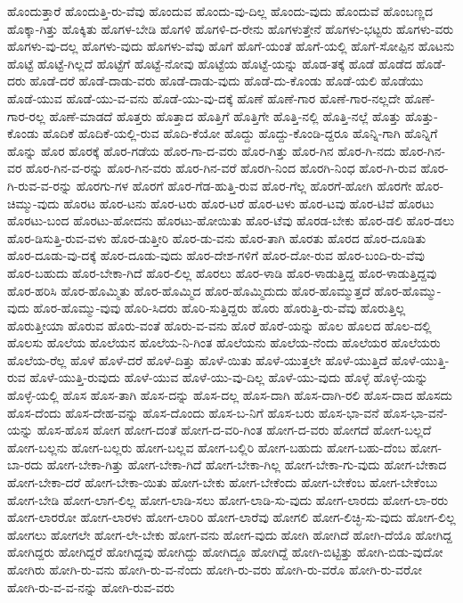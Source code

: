 {ಹೊಂದುತ್ತಾರೆ
ಹೊಂದುತ್ತಿ-ರು-ವೆವು
ಹೊಂದುವ
ಹೊಂದು-ವು-ದಿಲ್ಲ
ಹೊಂದು-ವುದು
ಹೊಂದುವೆ
ಹೊಂಬಣ್ಣದ
ಹೊಕ್ಕಾ-ಗಿತ್ತು
ಹೊಕ್ಕಿತು
ಹೊಗಳ-ಬೇಡಿ
ಹೊಗಳಿ
ಹೊಗಳಿ-ದ-ರೇನು
ಹೊಗಳುತ್ತೇನೆ
ಹೊಗಳು-ಭಟ್ಟರು
ಹೊಗಳು-ವರು
ಹೊಗಳು-ವು-ದಲ್ಲ
ಹೊಗಳು-ವುದು
ಹೊಗಳು-ವೆವು
ಹೊಗೆ
ಹೊಗೆ-ಯಂತೆ
ಹೊಗೆ-ಯಲ್ಲಿ
ಹೊಗೆ-ಸೋಪ್ಪಿನ
ಹೊಟನು
ಹೊಟ್ಟೆ
ಹೊಟ್ಟೆ-ಗಿಲ್ಲದೆ
ಹೊಟ್ಟೆಗೆ
ಹೊಟ್ಟೆ-ನೋವು
ಹೊಟ್ಟೆಯ
ಹೊಟ್ಟೆ-ಯನ್ನು
ಹೊಡ-ತಕ್ಕೆ
ಹೊಡೆ
ಹೊಡೆದ
ಹೊಡೆ-ದರು
ಹೊಡೆ-ದರೆ
ಹೊಡೆ-ದಾಡು-ವರು
ಹೊಡೆ-ದಾಡು-ವುದು
ಹೊಡೆ-ದು-ಕೊಂಡು
ಹೊಡೆ-ಯಲಿ
ಹೊಡೆಯು
ಹೊಡೆ-ಯುವ
ಹೊಡೆ-ಯು-ವ-ವನು
ಹೊಡೆ-ಯು-ವು-ದಕ್ಕೆ
ಹೊಣೆ
ಹೊಣೆ-ಗಾರ
ಹೊಣೆ-ಗಾರ-ನಲ್ಲದೇ
ಹೊಣೆ-ಗಾರ-ರಲ್ಲ
ಹೊಣೆ-ಮಾಡದೆ
ಹೊತ್ತರು
ಹೊತ್ತಾದ
ಹೊತ್ತಿಗೆ
ಹೊತ್ತಿಗೇ
ಹೊತ್ತಿ-ನಲ್ಲಿ
ಹೊತ್ತಿ-ನಲ್ಲೆ
ಹೊತ್ತು
ಹೊತ್ತು-ಕೊಂಡು
ಹೊದಿಕೆ
ಹೊದಿಕೆ-ಯಲ್ಲಿ-ರುವ
ಹೊದಿ-ಕೆಯೋ
ಹೊದ್ದು
ಹೊದ್ದು-ಕೊಂಡಿ-ದ್ದರೂ
ಹೊನ್ನಿ-ಗಾಗಿ
ಹೊನ್ನಿಗೆ
ಹೊನ್ನು
ಹೊರ
ಹೊರಕ್ಕೆ
ಹೊರ-ಗಡೆಯ
ಹೊರ-ಗಾ-ದ-ವರು
ಹೊರ-ಗಿತ್ತು
ಹೊರ-ಗಿನ
ಹೊರ-ಗಿ-ನದು
ಹೊರ-ಗಿನ-ವರ
ಹೊರ-ಗಿನ-ವ-ರನ್ನು
ಹೊರ-ಗಿನ-ವರು
ಹೊರ-ಗಿನ-ವರೆ
ಹೊರಗಿ-ನಿಂದ
ಹೊರಗಿ-ನಿಂಧ
ಹೊರ-ಗಿ-ರುವ
ಹೊರ-ಗಿ-ರುವ-ವ-ರನ್ನು
ಹೊರಗು-ಗಳ
ಹೊರಗೆ
ಹೊರ-ಗೆಡ-ಹುತ್ತಿ-ರುವ
ಹೊರ-ಗೆಲ್ಲ
ಹೊರಗೆ-ಹೋಗಿ
ಹೊರಗೇ
ಹೊರ-ಚಿಮ್ಮು-ವುದು
ಹೊರಟ
ಹೊರ-ಟನು
ಹೊರ-ಟರು
ಹೊರ-ಟರೆ
ಹೊರ-ಟಳು
ಹೊರ-ಟವು
ಹೊರ-ಟಿವೆ
ಹೊರಟು
ಹೊರಟು-ಬಂದ
ಹೊರಟು-ಹೋದನು
ಹೊರಟು-ಹೋಯಿತು
ಹೊರ-ಟೆವು
ಹೊರಡ-ಬೇಕು
ಹೊರ-ಡಲಿ
ಹೊರ-ಡಲು
ಹೊರ-ಡಿಸುತ್ತಿ-ರುವ-ವಳು
ಹೊರ-ಡುತ್ತೀರಿ
ಹೊರ-ಡು-ವನು
ಹೊರ-ತಾಗಿ
ಹೊರತು
ಹೊರದ
ಹೊರ-ದೂಡಿತು
ಹೊರ-ದೂಡು-ವು-ದಕ್ಕೆ
ಹೊರ-ದೂಡು-ವುದು
ಹೊರ-ದೇಶ-ಗಳಿಗೆ
ಹೊರ-ದೋ-ರುವ
ಹೊರ-ಬಂದಿ-ರು-ವೆವು
ಹೊರ-ಬಹುದು
ಹೊರ-ಬೇಕಾ-ಗಿದೆ
ಹೊರ-ಲಿಲ್ಲ
ಹೊರಲು
ಹೊರ-ಳಾಡಿ
ಹೊರ-ಳಾಡುತ್ತಿದ್ದ
ಹೊರ-ಳಾಡುತ್ತಿದ್ದವು
ಹೊರ-ಹರಿಸಿ
ಹೊರ-ಹೊಮ್ಮಿತು
ಹೊರ-ಹೊಮ್ಮಿದ
ಹೊರ-ಹೊಮ್ಮಿದುದು
ಹೊರ-ಹೊಮ್ಮುತ್ತದೆ
ಹೊರ-ಹೊಮ್ಮು-ವುದು
ಹೊರ-ಹೊಮ್ಮು-ವುವು
ಹೊರಿ-ಸಿದರು
ಹೊರಿ-ಸುತ್ತಿದ್ದರು
ಹೊರು
ಹೊರುತ್ತಿ-ರು-ವೆವು
ಹೊರುತ್ತಿಲ್ಲ
ಹೊರುತ್ತೀಯಾ
ಹೊರುವ
ಹೊರು-ವಂತೆ
ಹೊರು-ವ-ವನು
ಹೊರೆ
ಹೊರೆ-ಯನ್ನು
ಹೊಲ
ಹೊಲದ
ಹೊಲ-ದಲ್ಲಿ
ಹೊಲಸು
ಹೊಲೆಯ
ಹೊಲೆಯನ
ಹೊಲೆಯ-ನಿ-ಗಿಂತ
ಹೊಲೆಯನು
ಹೊಲೆಯ-ನೆಂದು
ಹೊಲೆಯರ
ಹೊಲೆಯರು
ಹೊಲೆಯ-ರೆಲ್ಲ
ಹೊಳೆ
ಹೊಳೆ-ದರೆ
ಹೊಳೆ-ದಿತ್ತು
ಹೊಳೆ-ಯಿತು
ಹೊಳೆ-ಯುತ್ತಲೇ
ಹೊಳೆ-ಯುತ್ತಿದೆ
ಹೊಳೆ-ಯುತ್ತಿ-ರುವ
ಹೊಳೆ-ಯುತ್ತಿ-ರುವುದು
ಹೊಳೆ-ಯುವ
ಹೊಳೆ-ಯು-ವು-ದಿಲ್ಲ
ಹೊಳೆ-ಯು-ವುದು
ಹೊಳ್ಳೆ
ಹೊಳ್ಳೆ-ಯನ್ನು
ಹೊಳ್ಳೆ-ಯಲ್ಲಿ
ಹೊಸ
ಹೊಸ-ತಾಗಿ
ಹೊಸ-ದನ್ನು
ಹೊಸ-ದಲ್ಲ
ಹೊಸ-ದಾಗಿ
ಹೊಸ-ದಾಗಿ-ರಲಿ
ಹೊಸ-ದಾದ
ಹೊಸದು
ಹೊಸ-ದೆಂದು
ಹೊಸ-ದೇಹ-ವನ್ನು
ಹೊಸ-ದೊಂದು
ಹೊಸ-ಬ-ನಿಗೆ
ಹೊಸ-ಬರು
ಹೊಸ-ಭಾ-ವನೆ
ಹೊಸ-ಭಾ-ವನೆ-ಯನ್ನು
ಹೊಸ-ಹೊಸ
ಹೋಗ
ಹೋಗ-ದಂತೆ
ಹೋಗ-ದ-ವರಿ-ಗಿಂತ
ಹೋಗ-ದ-ವರು
ಹೋಗದೆ
ಹೋಗ-ಬಲ್ಲದೆ
ಹೋಗ-ಬಲ್ಲನು
ಹೋಗ-ಬಲ್ಲರು
ಹೋಗ-ಬಲ್ಲವ
ಹೋಗ-ಬಲ್ಲಿರಿ
ಹೋಗ-ಬಹುದು
ಹೋಗ-ಬಹು-ದೆಂಬ
ಹೋಗ-ಬಾ-ರದು
ಹೋಗ-ಬೇಕಾ-ಗಿತ್ತು
ಹೋಗ-ಬೇಕಾ-ಗಿದೆ
ಹೋಗ-ಬೇಕಾ-ಗಿಲ್ಲ
ಹೋಗ-ಬೇಕಾ-ಗು-ವುದು
ಹೋಗ-ಬೇಕಾದ
ಹೋಗ-ಬೇಕಾ-ದರೆ
ಹೋಗ-ಬೇಕಾ-ಯಿತು
ಹೋಗ-ಬೇಕು
ಹೋಗ-ಬೇಕೆಂದು
ಹೋಗ-ಬೇಕೆಂಬ
ಹೋಗ-ಬೇಕೆಂಬು
ಹೋಗ-ಬೇಡಿ
ಹೋಗ-ಲಾಗ-ಲಿಲ್ಲ
ಹೋಗ-ಲಾಡಿ-ಸಲು
ಹೋಗ-ಲಾಡಿ-ಸು-ವುದು
ಹೋಗ-ಲಾರದು
ಹೋಗ-ಲಾ-ರರು
ಹೋಗ-ಲಾರರೋ
ಹೋಗ-ಲಾರಳು
ಹೋಗ-ಲಾರಿರಿ
ಹೋಗ-ಲಾರೆವು
ಹೋಗಲಿ
ಹೋಗ-ಲಿಚ್ಛಿ-ಸು-ವುದು
ಹೋಗ-ಲಿಲ್ಲ
ಹೋಗಲು
ಹೋಗಲೇ
ಹೋಗ-ಲೇ-ಬೇಕು
ಹೋಗ-ವನು
ಹೋಗ-ವುದು
ಹೋಗಿ
ಹೋಗಿದೆ
ಹೋಗಿ-ದೆಯೊ
ಹೋಗಿದ್ದ
ಹೋಗಿದ್ದರು
ಹೋಗಿದ್ದರೆ
ಹೋಗಿದ್ದವು
ಹೋಗಿದ್ದು
ಹೋಗಿದ್ದೂ
ಹೋಗಿದ್ದೆ
ಹೋಗಿ-ಬಿಟ್ಟಿತ್ತು
ಹೋಗಿ-ಬಿಡು-ವುದೋ
ಹೋಗಿರು
ಹೋಗಿ-ರು-ವನು
ಹೋಗಿ-ರು-ವ-ನೆಂದು
ಹೋಗಿ-ರು-ವರು
ಹೋಗಿ-ರು-ವರೊ
ಹೋಗಿ-ರು-ವರೋ
ಹೋಗಿ-ರು-ವ-ವ-ನನ್ನು
ಹೋಗಿ-ರುವ-ವರು
}
